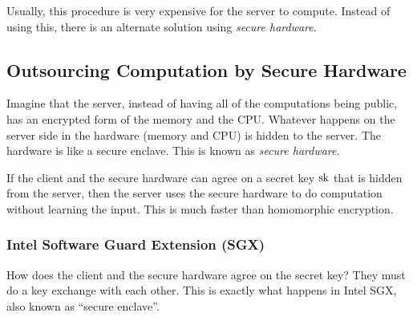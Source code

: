 Usually, this procedure is very expensive for the server to compute. Instead of using this, there is an alternate solution using \textit{secure hardware}.

\subsection{Outsourcing Computation by Secure Hardware}

Imagine that the server, instead of having all of the computations being public, has an encrypted form of the memory and the CPU. Whatever happens on the server side in the hardware (memory and CPU) is hidden to the server. The hardware is like a secure enclave. This is known as \textit{secure hardware}.

If the client and the secure hardware can agree on a secret key $\mathrm{sk}$ that is hidden from the server, then the server uses the secure hardware to do computation without learning the input. This is much faster than homomorphic encryption.


\subsubsection{Intel Software Guard Extension (SGX)}

How does the client and the secure hardware agree on the secret key? They must do a key exchange with each other. This is exactly what happens in Intel SGX, also known as ``secure enclave''.

